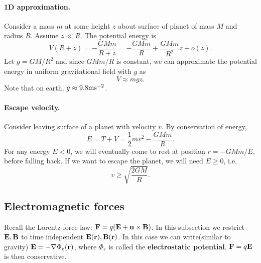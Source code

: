 \paragraph{1D approximation.} Consider a mass $m$ at some height $z$ about surface of planet of mass $M$ and radius $R$. Assume $z\ll R $. The potential energy is 
\[
    V(R+z) = -\frac{GMm}{R+z} = -\frac{GMm}{R}+\frac{GMm}{R^2}z+o(z).
\]
Let $ g = GM/R^2 $ and since $ GMm/R $ is constant, we can approximate the potential energy in uniform gravitational field with $g$ as 
\[
    V\approx mgz.
\]
Note that on earth, $ g\approx 9.8\mathrm{m}\mathrm{s}^{-2} $.

\paragraph{Escape velocity.} Consider leaving surface of a planet with velocity $v$. By conservation of energy,
\[
    E = T+V = \frac{1}{2}mv^2-\frac{GMm}{R}.
\]
For any energy $E < 0$, we will eventually come to rest at position $r = −GMm/E$, before falling back. If we want to escape the planet, we will need $ E\ge 0 $, i.e. 
\[
    v\ge \sqrt{\frac{2GM}{R}}.
\]
\begin{center}
\end{center}

\subsection{Electromagnetic forces}
Recall the Lorentz force law: $ \mathbf{F} = q({\bf E}+{\bf u} \times {\bf B}) $. In this subsection we restrict ${\bf E},{\bf B}$ to time independent $ {\bf E}({\bf r}),{\bf B}({\bf r}) $. In this case we can write(similar to gravity) $ {\bf E} = - \nabla \Phi_e({\bf r}) $, where $ \Phi_e $ is called the \textbf{electrostatic potential}. ${\bf F}=q{\bf E}$ is then conservative.


